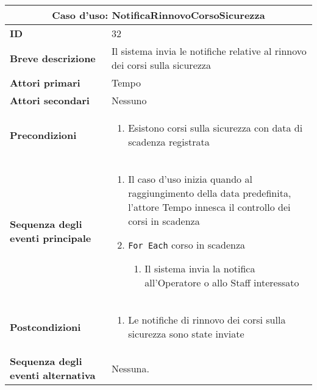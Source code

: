 \documentclass[a4paper]{report}
\begin{document}
\clearpage
\begin{table}[H]
\vspace*{-0cm}
\renewcommand{\arraystretch}{1.9}
\begin{tabular}{|p{3.9cm}|p{9.9cm}|}
\hline
\multicolumn{2}{|c|}{\textbf{Caso d’uso: NotificaRinnovoCorsoSicurezza}} \\ \hline
	\textbf{ID} & 32 \\ \hline
	\textbf{Breve descrizione} & Il sistema invia le notifiche relative al rinnovo dei corsi sulla sicurezza \\ \hline
	\textbf{Attori primari} & Tempo \\ \hline
	\textbf{Attori secondari} & Nessuno \\ \hline
	\textbf{Precondizioni} & \begin{enumerate}[leftmargin=14pt,label=\arabic*.,labelsep=0.5em,topsep=0pt,partopsep=0pt,parsep=0pt,itemsep=0pt]
        \item Esistono corsi sulla sicurezza con data di scadenza registrata
    \end{enumerate} \\ \hline
	\textbf{Sequenza degli eventi principale} & 
\begin{enumerate}[leftmargin=14pt,label=\arabic*.,labelsep=0.5em,topsep=0pt,partopsep=0pt,parsep=0pt,itemsep=0pt]
    \item Il caso d’uso inizia quando al raggiungimento della data predefinita, l’attore Tempo innesca il controllo dei corsi in scadenza
    \item \texttt{For Each} corso in scadenza
    \begin{enumerate}[label=\arabic{enumi}.\arabic*.,leftmargin=22pt,labelsep=0.5em,topsep=0pt,partopsep=0pt,parsep=0pt,itemsep=0pt]
        \item Il sistema invia la notifica all’Operatore o allo Staff interessato
    \end{enumerate}
\end{enumerate}\\ \hline
	\textbf{Postcondizioni} &
    \begin{enumerate}[label=\arabic*.,leftmargin=14pt,labelsep=0.5em,topsep=0pt,partopsep=0pt,parsep=0pt,itemsep=0pt]
        \item Le notifiche di rinnovo dei corsi sulla sicurezza sono state inviate
    \end{enumerate} \\ \hline
	\textbf{Sequenza degli eventi alternativa} & Nessuna. \\ \hline
\end{tabular}
\end{table}
\end{document}

